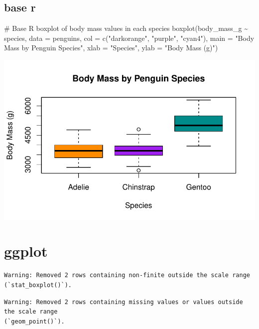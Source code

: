 \documentclass[
  letterpaper,
  DIV=11,
  numbers=noendperiod]{scrreprt}
\newenvironment{Shaded}{\begin{snugshade}}{\end{snugshade}}
\newcommand{\AttributeTok}[1]{\textcolor[rgb]{0.40,0.45,0.13}{#1}}
\newcommand{\CommentTok}[1]{\textcolor[rgb]{0.37,0.37,0.37}{#1}}
\newcommand{\FunctionTok}[1]{\textcolor[rgb]{0.28,0.35,0.67}{#1}}
\newcommand{\NormalTok}[1]{\textcolor[rgb]{0.00,0.23,0.31}{#1}}
\newcommand{\SpecialCharTok}[1]{\textcolor[rgb]{0.37,0.37,0.37}{#1}}
\newcommand{\StringTok}[1]{\textcolor[rgb]{0.13,0.47,0.30}{#1}}
\begin{document}
\begin{tcolorbox}
\section{base r}

\begin{Shaded}
\begin{Highlighting}[]
\CommentTok{\# Base R boxplot of body mass values in each species}
\FunctionTok{boxplot}\NormalTok{(body\_mass\_g }\SpecialCharTok{\textasciitilde{}}\NormalTok{ species, }\AttributeTok{data =}\NormalTok{ penguins,}
        \AttributeTok{col =} \FunctionTok{c}\NormalTok{(}\StringTok{"darkorange"}\NormalTok{, }\StringTok{"purple"}\NormalTok{, }\StringTok{"cyan4"}\NormalTok{),}
        \AttributeTok{main =} \StringTok{"Body Mass by Penguin Species"}\NormalTok{,}
        \AttributeTok{xlab =} \StringTok{"Species"}\NormalTok{,}
        \AttributeTok{ylab =} \StringTok{"Body Mass (g)"}\NormalTok{)}
\end{Highlighting}
\end{Shaded}

\includegraphics{scripts/02_dataViz/class4_files/figure-pdf/boxplot-1.pdf}

\end{tcolorbox}

\section{ggplot}

\begin{verbatim}
Warning: Removed 2 rows containing non-finite outside the scale range
(`stat_boxplot()`).
\end{verbatim}

\begin{verbatim}
Warning: Removed 2 rows containing missing values or values outside the scale range
(`geom_point()`).
\end{verbatim}
\end{document}
